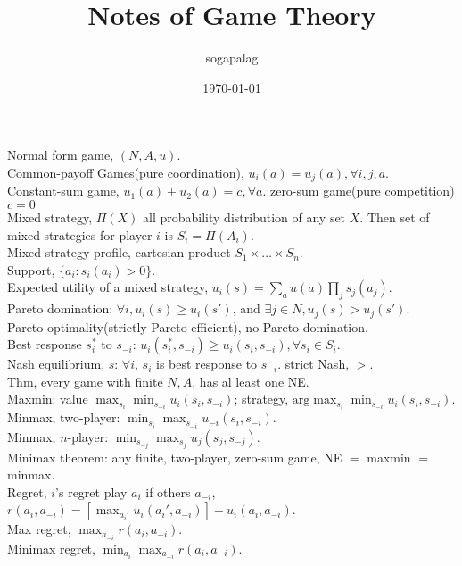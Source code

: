 \documentclass[paper=a4, fontsize=11pt]{scrartcl} %
\title{Notes of Game Theory}
\author{sogapalag}
\date{\normalsize\today}
\numberwithin{equation}{section} %
\numberwithin{figure}{section} %
\numberwithin{table}{section} %
\def \arg {\text{arg}}
\begin{document}
\maketitle
Normal form game, $(N,A,u)$.\\
Common-payoff Games(pure coordination), $u_i(a)=u_j(a),\forall i,j,a$.\\
Constant-sum game, $u_1(a)+u_2(a)=c,\forall a$. zero-sum game(pure competition) $c=0$\\
Mixed strategy, $\Pi(X)$ all probability distribution of any set $X$. Then set of mixed strategies for player $i$ is $S_i=\Pi(A_i)$.\\
Mixed-strategy profile, cartesian product $S_1\times \dots \times S_n$.\\
Support, $\{a_i:s_i(a_i)>0\}$.\\
Expected utility of a mixed strategy, $u_i(s)=\sum_a u(a)\prod_j s_j(a_j)$.\\
Pareto domination: $\forall i, u_i(s)\geq u_i(s')$, and $\exists j\in N, u_j(s)>u_j(s')$.\\
Pareto optimality(strictly Pareto efficient), no Pareto domination.\\
Best response $s_i^*$ to $s_{-i}$: $u_i(s_i^*, s_{-i}) \geq u_i(s_i,s_{-i}),\forall s_i\in S_i$.\\
Nash equilibrium, $s$: $\forall i$, $s_i$ is best response to $s_{-i}$. strict Nash, $>$.\\
Thm, every game with finite $N,A$, has al least one NE.\\
Maxmin: value $\max_{s_i}\min_{s_{-i}} u_i(s_i,s_{-i})$; strategy, $\arg \max_{s_i}\min_{s_{-i}} u_i(s_i,s_{-i})$.\\
Minmax, two-player: $\min_{s_i}\max_{s_{-i}} u_{-i}(s_i,s_{-i})$.\\
Minmax, $n$-player: $\min_{s_{-j}}\max_{s_j} u_{j}(s_j,s_{-j})$.\\
Minimax theorem: any finite, two-player, zero-sum game, NE $=$ maxmin $=$ minmax.\\
Regret, $i$'s regret play $a_i$ if others $a_{-i}$, $r(a_i,a_{-i})=[\max_{a_i'} u_i(a_i',a_{-i})] - u_i(a_i,a_{-i})$.\\
Max regret, $\max_{a_{-i}} r(a_i,a_{-i})$.\\
Minimax regret, $\min_{a_i}\max_{a_{-i}} r(a_i,a_{-i})$.\\
\end{document}
